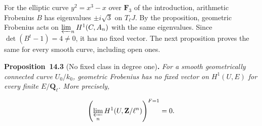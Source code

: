 \documentclass[11pt]{article}
\newenvironment{bpstatement}[2]{\par\addvspace{0.6\baselineskip}\noindent\textbf{#1}#2\textbf{.}\enspace\ignorespaces}
  {\par\addvspace{0.4\baselineskip}}
\newenvironment{bpstatementit}[2]{\begin{bpstatement}{#1}{#2}\itshape\ignorespaces}{\end{bpstatement}}
\begin{document}
\label{bp50}%
For the elliptic curve \(y^2=x^3-x\) over \(\mathbf F_3\) of the introduction, arithmetic Frobenius \(B\) has eigenvalues \(\pm i\sqrt3\) on \(T_\ell J\). By the proposition, geometric Frobenius acts on \(\varprojlim_nH^1(C,A_n)\) with the same eigenvalues. Since \(\det(B^t-1)=4\ne0\), it has no fixed vector. The next proposition proves the same for every smooth curve, including open ones.

\label{bp51}%
\begin{bpstatementit}{Proposition~14.3}{ (No fixed class in degree one)}
For a smooth geometrically connected curve \(U_0/k_0\), geometric Frobenius has no fixed vector on \(H^1(U,E)\) for every finite \(E/\mathbf Q_\ell\).  More precisely,

\[
\left(\varprojlim_nH^1(U,\mathbf Z/\ell^n)\right)^{F=1}=0.
\]
\end{bpstatementit}
\end{document}
